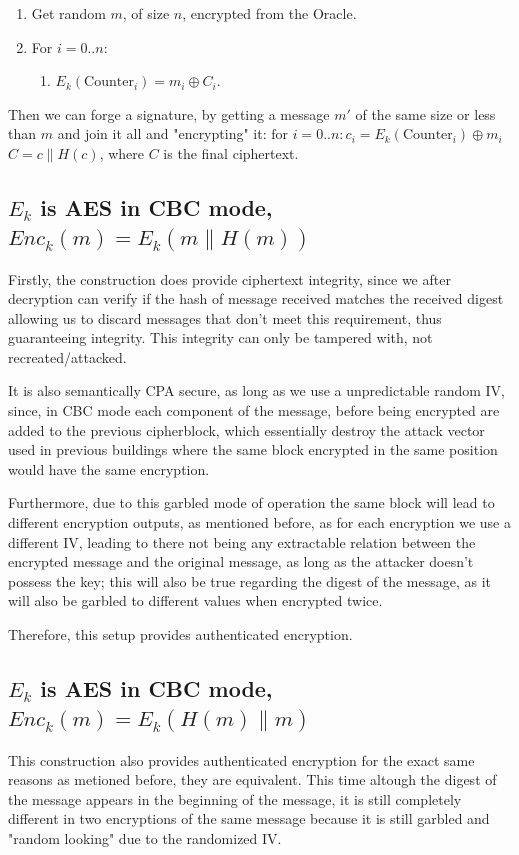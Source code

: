 \documentclass{article}
\begin{document}
\begin{enumerate}
    \item Get random $m$, of size $n$, encrypted from the Oracle.
    \item For $i=0..n$: \begin{enumerate}
        \item $E_k(\text{Counter}_i) = m_i \oplus C_i$.
    \end{enumerate}
\end{enumerate}
Then we can forge a signature, by getting a message $m'$ of the same size or less than $m$ and join it all and "encrypting" it:
$
\text{for } i=0..n:
    c_i = E_k(\text{Counter}_i) \oplus m_i
$
$C = c \| H(c)$, where $C$ is the final ciphertext.


\subsection{$E_k$ is AES in CBC mode, $Enc_k(m) = E_k(m \| H(m))$}
Firstly, the construction does provide ciphertext integrity, since we after decryption can verify if the hash of message received matches the received digest allowing us to discard messages that don't meet this requirement, thus guaranteeing integrity. This integrity can only be tampered with, not recreated/attacked.

It is also semantically CPA secure, as long as we use a unpredictable random IV, since, in CBC mode each component of the message, before being encrypted are added to the previous cipherblock, which essentially destroy the attack vector used in previous buildings where the same block encrypted in the same position would have the same encryption.

Furthermore, due to this garbled mode of operation the same block will lead to different encryption outputs, as mentioned before, as for each encryption we use a different IV, leading to there not being any extractable relation between the encrypted message and the original message, as long as the attacker doesn't possess the key; this will also be true regarding the digest of the message, as it will also be garbled to different values when encrypted twice.

Therefore, this setup provides authenticated encryption.

\subsection{$E_k$ is AES in CBC mode, $Enc_k(m) = E_k(H(m) \| m)$}
This construction also provides authenticated encryption for the exact same reasons as metioned before, they are equivalent. This time altough the digest of the message appears in the beginning of the message, it is still completely different in two encryptions of the same message because it is still garbled and "random looking" due to the randomized IV.
\end{document}
